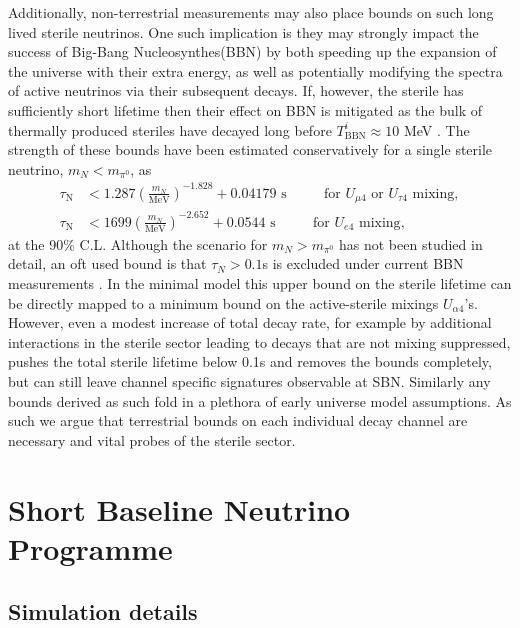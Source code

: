 \documentclass[11pt, a4paper]{article}
\begin{document}
Additionally, non-terrestrial measurements may also place bounds on such long lived sterile neutrinos. One such implication is they may strongly impact the success of Big-Bang Nucleosynthes(BBN) by both speeding up the expansion of the universe with their extra energy, as well as potentially modifying the spectra of active neutrinos via their subsequent decays. If, however, the sterile has sufficiently short lifetime  then their effect on BBN is mitigated as the bulk of thermally produced steriles have decayed long before $T^i_\text{BBN} \approx 10$ MeV \cite{Fields:2006ga}. The strength of these bounds have been estimated conservatively for a single sterile neutrino, $m_N < m_{\pi^0}$, as \cite{Dolgov:2000jw,Dolgov:2000pj}
\begin{align*}
	\tau_\text{N} &< 1.287 \left( \frac{m_N}{\text{MeV}}\right)^{-1.828}+0.04179 \text{  s    $\qquad$  for $U_{\mu 4}$ or $U_{\tau 4}$ mixing},\\
	\tau_\text{N} &< 1699 \left( \frac{m_N}{\text{MeV}}\right)^{-2.652}+0.0544 \text{  s    $\qquad$  for $U_{e 4}$ mixing},
\end{align*}
at the 90\% C.L. Although the scenario for $m_N > m_{\pi^0}$ has not been studied in detail, an oft used bound is that $\tau_N > 0.1$s is excluded under current BBN measurements \cite{Dolgov:2000j}. In the minimal model this upper bound on the sterile lifetime can be directly mapped to a minimum bound on the active-sterile mixings $U_{\alpha 4}$'s. However, even a modest increase of total decay rate, for example by additional interactions in the sterile sector leading to decays that are not mixing suppressed, pushes the total sterile lifetime below 0.1s and removes the bounds completely, but can still leave channel specific signatures observable at SBN. Similarly any bounds derived as such fold in a plethora of early universe model assumptions. As such we argue that terrestrial bounds on each individual decay channel are necessary and vital probes of the sterile sector. \\

\section{\label{sec:simulation}Short Baseline Neutrino Programme}

\subsection{Simulation details}
\end{document}
